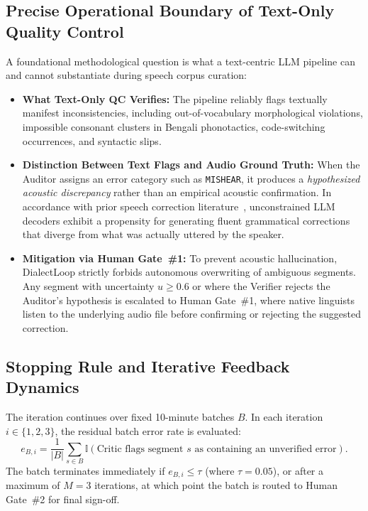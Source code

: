 \subsection{Precise Operational Boundary of Text-Only Quality Control}
\label{subsec:text_qc_boundary}
A foundational methodological question is what a text-centric LLM pipeline can and cannot substantiate during speech corpus curation:
\begin{itemize}
    \item \textbf{What Text-Only QC Verifies:} The pipeline reliably flags textually manifest inconsistencies, including out-of-vocabulary morphological violations, impossible consonant clusters in Bengali phonotactics, code-switching occurrences, and syntactic slips.
    \item \textbf{Distinction Between Text Flags and Audio Ground Truth:} When the Auditor assigns an error category such as \texttt{MISHEAR}, it produces a \textit{hypothesized acoustic discrepancy} rather than an empirical acoustic confirmation. In accordance with prior speech correction literature~\citep{mani2020asr,liao2023investigating}, unconstrained LLM decoders exhibit a propensity for generating fluent grammatical corrections that diverge from what was actually uttered by the speaker.
    \item \textbf{Mitigation via Human Gate~\#1:} To prevent acoustic hallucination, DialectLoop strictly forbids autonomous overwriting of ambiguous segments. Any segment with uncertainty $u \ge 0.6$ or where the Verifier rejects the Auditor's hypothesis is escalated to Human Gate~\#1, where native linguists listen to the underlying audio file before confirming or rejecting the suggested correction.
\end{itemize}

\subsection{Stopping Rule and Iterative Feedback Dynamics}
The iteration continues over fixed 10-minute batches $B$. In each iteration $i \in \{1, 2, 3\}$, the residual batch error rate is evaluated:
\begin{equation}
    e_{B, i} = \frac{1}{|B|} \sum_{s \in B} \mathbb{I}(\text{Critic flags segment } s \text{ as containing an unverified error}).
\end{equation}
The batch terminates immediately if $e_{B, i} \le \tau$ (where $\tau = 0.05$), or after a maximum of $M = 3$ iterations, at which point the batch is routed to Human Gate~\#2 for final sign-off.

